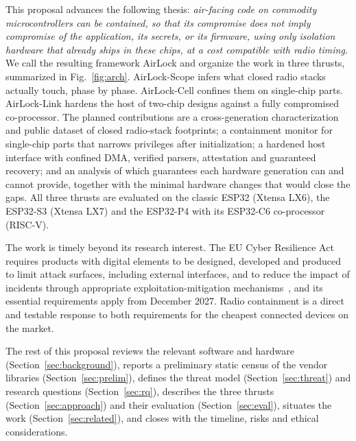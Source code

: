 \documentclass[conference,10pt]{IEEEtran}
\begin{document}
This proposal advances the following thesis: \emph{air-facing code on commodity microcontrollers can be contained, so that its compromise does not imply compromise of the application, its secrets, or its firmware, using only isolation hardware that already ships in these chips, at a cost compatible with radio timing.} We call the resulting framework AirLock and organize the work in three thrusts, summarized in Fig.~\ref{fig:arch}. AirLock-Scope infers what closed radio stacks actually touch, phase by phase. AirLock-Cell confines them on single-chip parts. AirLock-Link hardens the host of two-chip designs against a fully compromised co-processor. The planned contributions are a cross-generation characterization and public dataset of closed radio-stack footprints; a containment monitor for single-chip parts that narrows privileges after initialization; a hardened host interface with confined DMA, verified parsers, attestation and guaranteed recovery; and an analysis of which guarantees each hardware generation can and cannot provide, together with the minimal hardware changes that would close the gaps. All three thrusts are evaluated on the classic ESP32 (Xtensa LX6), the ESP32-S3 (Xtensa LX7) and the ESP32-P4 with its ESP32-C6 co-processor (RISC-V).

The work is timely beyond its research interest. The EU Cyber Resilience Act requires products with digital elements to be designed, developed and produced to limit attack surfaces, including external interfaces, and to reduce the impact of incidents through appropriate exploitation-mitigation mechanisms~\cite{cra2024}, and its essential requirements apply from December 2027. Radio containment is a direct and testable response to both requirements for the cheapest connected devices on the market.

The rest of this proposal reviews the relevant software and hardware (Section~\ref{sec:background}), reports a preliminary static census of the vendor libraries (Section~\ref{sec:prelim}), defines the threat model (Section~\ref{sec:threat}) and research questions (Section~\ref{sec:rq}), describes the three thrusts (Section~\ref{sec:approach}) and their evaluation (Section~\ref{sec:eval}), situates the work (Section~\ref{sec:related}), and closes with the timeline, risks and ethical considerations.
\end{document}
